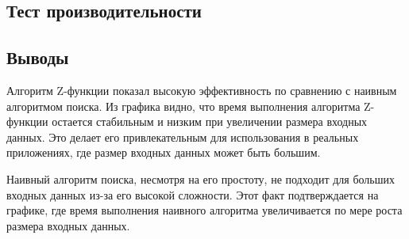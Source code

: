 \documentclass[12pt]{article}
\begin{document}
\subsection*{Тест производительности}

\subsection*{Выводы}

Алгоритм Z-функции показал высокую эффективность по сравнению с наивным алгоритмом поиска. Из графика видно, что время выполнения алгоритма Z-функции остается стабильным и низким при увеличении размера входных данных. Это делает его привлекательным для использования в реальных приложениях, где размер входных данных может быть большим.

Наивный алгоритм поиска, несмотря на его простоту, не подходит для больших входных данных из-за его высокой сложности. Этот факт подтверждается на графике, где время выполнения наивного алгоритма увеличивается по мере роста размера входных данных.
\end{document}
